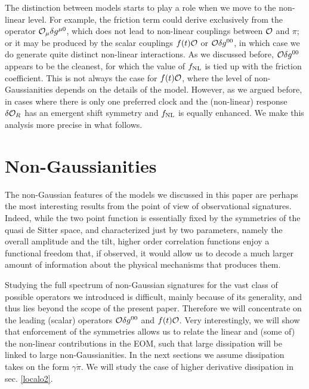 \documentclass[11pt,amsmath,floats,floatfix,nofootinbib,secnumarabic, superscriptaddress, tightenlines]{revtex4}
\newcommand{\calo}{{\cal O}}
\begin{document}
{The distinction between models starts to play a role when we move to the non-linear level. For example, the friction term could derive exclusively from the operator $\calo_\mu \delta g^{\mu0}$, which does not lead to non-linear couplings between $\calo$ and $\pi$; or it may be produced by the scalar couplings $f(t)\calo$ or $\calo \delta g^{00}$, in which case we do generate quite distinct non-linear interactions. As we discussed before, $\calo \delta g^{00}$ appears to be the cleanest, for which the value of $f_{\rm NL}$ is tied up with the friction coefficient. This is not always the case for $f(t)\calo$, where the level of non-Gaussianities depends on the details of the model. However, as we argued before, in cases where there is only one preferred clock and the (non-linear) response $\delta\calo_R$ has an emergent shift symmetry and $f_{\rm NL}$ is equally enhanced. We make this analysis more precise in what follows.

\section{Non-Gaussianities}\label{nongaus}

The non-Gaussian features of the models we discussed in this paper are perhaps the most interesting results from the point of view of observational signatures. Indeed, while the two point function is essentially fixed by the symmetries of the quasi de Sitter space, and characterized just by two parameters, namely the overall amplitude and the tilt, higher order correlation functions enjoy a functional freedom that, if observed, it would allow us to decode a much larger amount of information about the physical mechanisms that produces them.

Studying the full spectrum of non-Gaussian signatures for the vast class of possible operators we introduced is difficult, mainly because of its generality, and thus lies beyond the scope of the present paper. Therefore we will concentrate on the leading (scalar) operators $\calo \delta g^{00}$ and $f(t)\calo$. Very interestingly, we will show that enforcement of the symmetries allows us to relate the linear and (some of) the non-linear contributions in the EOM, such that large dissipation will be linked to large non-Gaussianities. In the next sections we assume dissipation takes on the form $\gamma\dot\pi$. We will study the case of higher derivative dissipation in sec. \ref{localo2}.


}
\end{document}
